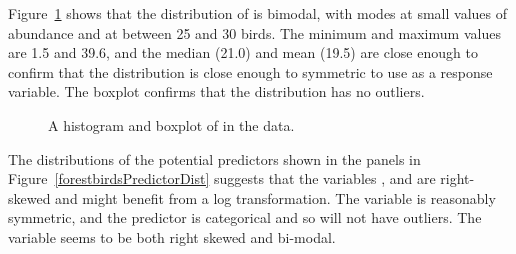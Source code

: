 Figure~\ref{forestbirdsAbundanceHistandBox} shows that the distribution of  is bimodal, with modes at small values of abundance and at between 25 and 30 birds. The minimum and maximum values are 1.5 and 39.6, and the median (21.0) and mean (19.5) are close enough to confirm that the distribution is close enough to symmetric to use as a response variable. The boxplot confirms that the distribution has no outliers.

	\begin{figure}[h!]
		\centering
		\caption{A histogram and boxplot of  in the  data.}
		\label{forestbirdsAbundanceHistandBox}
	\end{figure}	
	

The distributions of the potential predictors shown in the panels in Figure~\ref{forestbirdsPredictorDist} suggests that the variables ,  and  are right-skewed and might benefit from a log transformation. The variable  is reasonably symmetric, and the  predictor  is categorical and so will not have outliers. The variable  seems to be both right skewed and bi-modal.

